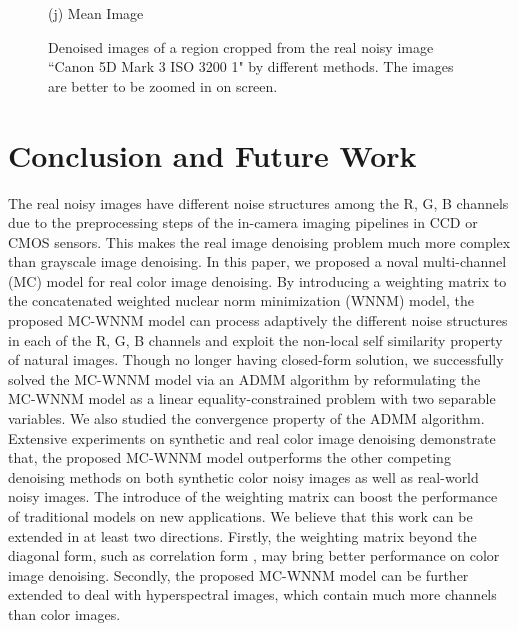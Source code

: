 \documentclass[10pt,twocolumn,letterpaper,sort&compress]{article}
\begin{document}
\begin{figure}
{\begin{minipage}[t]{0.195\textwidth}
{\footnotesize (j) Mean Image}
\end{minipage}
}\vspace{-0.5mm}
\caption{Denoised images of a region cropped from the real noisy image ``Canon 5D Mark 3 ISO 3200 1" \cite{crosschannel2016} by different methods. The images are better to be zoomed in on screen.}
\label{f5}
\vspace{0.5mm}
\end{figure}

\section{Conclusion and Future Work}

The real noisy images have different noise structures among the R, G, B channels due to the preprocessing steps of the in-camera imaging pipelines in CCD or CMOS sensors. This makes the real image denoising problem much more complex than grayscale image denoising. In this paper, we proposed a noval multi-channel (MC) model for real color image denoising. By introducing a weighting matrix to the concatenated weighted nuclear norm minimization (WNNM) model, the proposed MC-WNNM model can process adaptively the different noise structures in each of the R, G, B channels and exploit the non-local self similarity property of natural images. Though no longer having closed-form solution, we successfully solved the MC-WNNM model via an ADMM algorithm by reformulating the MC-WNNM model as a linear equality-constrained problem with two separable variables. We also studied the convergence property of the ADMM algorithm. Extensive experiments on synthetic and real color image denoising demonstrate that, the proposed MC-WNNM model outperforms the other competing denoising methods on both synthetic color noisy images as well as real-world noisy images. The introduce of the weighting matrix can boost the performance of traditional models on new applications. We believe that this work can be extended in at least two directions. Firstly, the weighting matrix beyond the diagonal form, such as correlation form \cite{nearcor}, may bring better performance on color image denoising. Secondly, the proposed MC-WNNM model can be further extended to deal with hyperspectral images, which contain much more channels than color images.



{
\small


}
\end{document}
